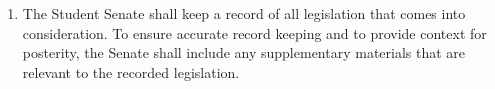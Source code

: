 \documentclass{uniondoc}
\begin{document}
\begin{enumerate}
\begin{enumerate}
\begin{enumerate}
\begin{enumerate}
				                  \item Should a Union body fail to vote or veto the legislation within the prescribed period, the Union body shall waive their right to do so.
			                  \end{enumerate}
		            \end{enumerate}
	      \end{enumerate}
	\item The Student Senate shall keep a record of all legislation that comes into consideration.
	      To ensure accurate record keeping and to provide context for posterity, the Senate shall include any supplementary materials that are relevant to the recorded legislation.
\end{enumerate}

\end{document}
